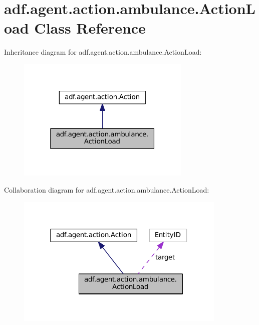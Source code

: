 \hypertarget{classadf_1_1agent_1_1action_1_1ambulance_1_1ActionLoad}{}\section{adf.\+agent.\+action.\+ambulance.\+Action\+Load Class Reference}
\label{classadf_1_1agent_1_1action_1_1ambulance_1_1ActionLoad}


Inheritance diagram for adf.\+agent.\+action.\+ambulance.\+Action\+Load\+:
\nopagebreak
\begin{figure}[H]
\begin{center}
\leavevmode
\includegraphics[width=235pt]{classadf_1_1agent_1_1action_1_1ambulance_1_1ActionLoad__inherit__graph}
\end{center}
\end{figure}


Collaboration diagram for adf.\+agent.\+action.\+ambulance.\+Action\+Load\+:
\nopagebreak
\begin{figure}[H]
\begin{center}
\leavevmode
\includegraphics[width=284pt]{classadf_1_1agent_1_1action_1_1ambulance_1_1ActionLoad__coll__graph}
\end{center}
\end{figure}
